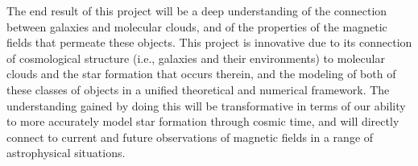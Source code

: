 


The end result of this project will be a deep understanding of the
connection between galaxies and molecular clouds, and of the
properties of the magnetic fields that permeate these objects.  This
project is innovative due to its connection of cosmological structure
(i.e., galaxies and their environments) to molecular clouds and the
star formation that occurs therein, and the modeling of both of these
classes of objects in a unified theoretical and numerical framework.
The understanding gained by doing this will be transformative in terms
of our ability to more accurately model star formation through cosmic
time, and will directly connect to current and future observations of
magnetic fields in a range of astrophysical situations.


